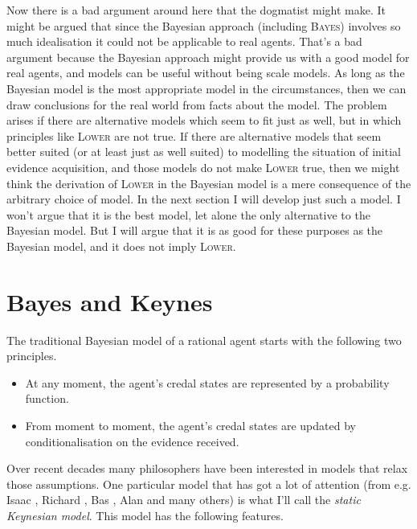 \noindent Now there is a bad argument around here that the dogmatist might make. It might be argued that since the Bayesian approach (including \textsc{Bayes}) involves so much idealisation it could not be applicable to real agents. That's a bad argument because the Bayesian approach might provide us with a good model for real agents, and models can be useful without being scale models. As long as the Bayesian model is the most appropriate model in the circumstances, then we can draw conclusions for the real world from facts about the model. The problem arises if there are alternative models which seem to fit just as well, but in which principles like \textsc{Lower} are not true. If there are alternative models that seem better suited (or at least just as well suited) to modelling the situation of initial evidence acquisition, and those models do not make \textsc{Lower} true, then we might think the derivation of \textsc{Lower} in the Bayesian model is a mere consequence of the arbitrary choice of model. In the next section I will develop just such a model. I won't argue that it is the best model, let alone the only alternative to the Bayesian model. But I will argue that it is as good for these purposes as the Bayesian model, and it does not imply \textsc{Lower}.

\section{Bayes and Keynes}

The traditional Bayesian model of a rational agent starts with the following two principles.

\begin{itemize}
\item At any moment, the agent's credal states are represented by a probability function.
\item From moment to moment, the agent's credal states are updated by conditionalisation on the evidence received.
\end{itemize}

\noindent Over recent decades many philosophers have been interested in models that relax those assumptions. One particular model that has got a lot of attention (from e.g. Isaac \citet{Levi1974, Levi1980}, Richard \citet{Jeffrey1983}, Bas \citet{vanFraassen1990}, Alan \citet{Hajek2000, Hajek2003} and many others) is what I'll call the \textit{static Keynesian model}. This model has the following features.


